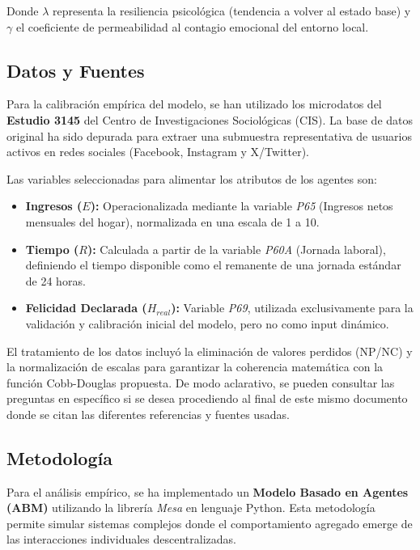 \documentclass[a4paper,12pt]{article}
\begin{document}
Donde $\lambda$ representa la resiliencia psicológica (tendencia a volver al estado base) y $\gamma$ el coeficiente de permeabilidad al contagio emocional del entorno local.

\subsection{Datos y Fuentes}

Para la calibración empírica del modelo, se han utilizado los microdatos del \textbf{Estudio 3145} del Centro de Investigaciones Sociológicas (CIS). La base de datos original ha sido depurada para extraer una submuestra representativa de usuarios activos en redes sociales (Facebook, Instagram y X/Twitter).

Las variables seleccionadas para alimentar los atributos de los agentes son:
\begin{itemize}
    \item \textbf{Ingresos ($E$):} Operacionalizada mediante la variable \textit{P65} (Ingresos netos mensuales del hogar), normalizada en una escala de 1 a 10.
    \item \textbf{Tiempo ($R$):} Calculada a partir de la variable \textit{P60A} (Jornada laboral), definiendo el tiempo disponible como el remanente de una jornada estándar de 24 horas.
    \item \textbf{Felicidad Declarada ($H_{real}$):} Variable \textit{P69}, utilizada exclusivamente para la validación y calibración inicial del modelo, pero no como input dinámico.
\end{itemize}

El tratamiento de los datos incluyó la eliminación de valores perdidos (NP/NC) y la normalización de escalas para garantizar la coherencia matemática con la función Cobb-Douglas propuesta. De modo aclarativo, se pueden consultar las preguntas en específico si se desea procediendo al final de este mismo documento donde se citan las diferentes referencias y fuentes usadas.

\subsection{Metodología}

Para el análisis empírico, se ha implementado un \textbf{Modelo Basado en Agentes (ABM)} utilizando la librería \textit{Mesa} en lenguaje Python. Esta metodología permite simular sistemas complejos donde el comportamiento agregado emerge de las interacciones individuales descentralizadas.
\end{document}
